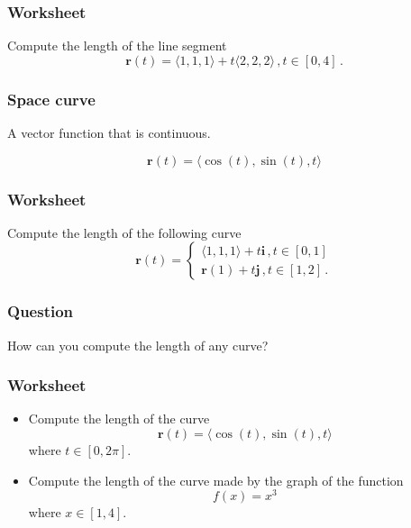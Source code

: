 \documentclass[aspectratio=169]{beamer}
\newcommand{\vect}{\mathbf}
\begin{document}
\begin{frame}
    \frametitle{Worksheet}
    Compute the length of the line segment
    \begin{equation*}
        \vect{r}(t) = \langle 1,1,1 \rangle + t \langle 2,2,2 \rangle \,, t\in [0, 4] \,.
    \end{equation*}
\end{frame}

\begin{frame}
    \frametitle{Space curve}
    A vector function that is continuous.

    \begin{example}
        \begin{equation*}
            \vect{r}(t) = \langle \cos(t), \sin(t), t \rangle
        \end{equation*}
    \end{example}
\end{frame}

\begin{frame}
    \frametitle{Worksheet}
    Compute the length of the following curve
    \begin{equation*}
        \vect{r}(t) = 
        \begin{cases}
            \langle 1,1,1 \rangle + t \vect{i} \,, t \in [0,1] \\
            \vect{r}(1) + t \vect{j} \,, t \in [1,2] \,.
        \end{cases}
    \end{equation*}
\end{frame}

\begin{frame}
    \frametitle{Question}
    How can you compute the length of any curve?
\end{frame}


\begin{frame}
    \frametitle{Worksheet}
    \begin{itemize}
        \item Compute the length of the curve
            $$\vect{r}(t) =  \langle \cos(t) ,\sin(t), t \rangle$$
            where $t\in [0,2\pi]$.
        \item Compute the length of the curve made by the graph of the function
    $$ f(x) = x^3 $$
    where $x \in [1,4]$.
    \end{itemize}
\end{frame}
\end{document}
